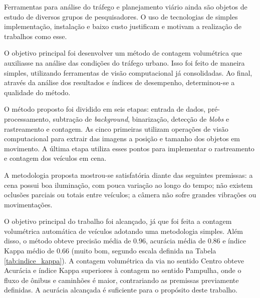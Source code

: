 


Ferramentas para análise do tráfego e planejamento viário ainda são objetos de estudo de diversos grupos de pesquisadores. O uso de tecnologias de simples implementação, instalação e baixo custo justificam e motivam a realização de trabalhos como esse.

O objetivo principal foi desenvolver um método de contagem volumétrica que auxiliasse na análise das condições do tráfego urbano. Isso foi feito de maneira simples, utilizando ferramentas de visão computacional já consolidadas. Ao final, através da análise dos resultados e índices de desempenho, determinou-se a qualidade do método.

O método proposto foi dividido em seis etapas: entrada de dados, pré-processamento, subtração de \textit{background}, binarização, detecção de \textit{blobs} e rastreamento e contagem. As cinco primeiras utilizam operações de visão computacional para extrair das imagens a posição e tamanho dos objetos em movimento. A última etapa utiliza esses pontos para implementar o rastreamento e contagem dos veículos em cena.

A metodologia proposta mostrou-se satisfatória diante das seguintes premissas: a cena possui boa iluminação, com pouca variação ao longo do tempo; não existem oclusões parciais ou totais entre veículos; a câmera não sofre grandes vibrações ou movimentações.

O objetivo principal do trabalho foi alcançado, já que foi feita a contagem volumétrica automática de veículos adotando uma metodologia simples. Além disso, o método obteve precisão média de $0.96$, acurácia média de $0.86$ e índice Kappa médio de $0.66$ (muito bom, segundo escala definida na Tabela \ref{tab:indice_kappa}). A contagem volumétrica da via no sentido Centro obteve Acurácia e índice Kappa superiores à contagem no sentido Pampulha, onde o fluxo de ônibus e caminhões é maior, contrariando as premissas previamente definidas. A acurácia alcançada é suficiente para o propósito deste trabalho.

